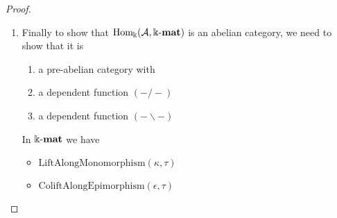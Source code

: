 \begin{proof}
\begin{enumerate}
\item Finally to show that $\mathrm{Hom_{\Bbbk}}(\mathcal{A},\Bbbk\textnormal{-}\mathbf{mat})$ is an abelian category, we need to show that it is
\begin{enumerate}
\renewcommand{\labelenumii}{(\roman{enumii})}
\item a pre-abelian category with
\item a dependent function $(-/-)$
\item a dependent function $(-\backslash -)$
\end{enumerate}
\begin{subproof}
In $\Bbbk\textnormal{-}\mathbf{mat}$ we have
\begin{itemize}
\item $\mathrm{LiftAlongMonomorphism}(\kappa,\tau)$
\item $\mathrm{ColiftAlongEpimorphism}(\epsilon,\tau)$
\end{itemize}
\end{subproof}
\end{enumerate}
\end{proof}

